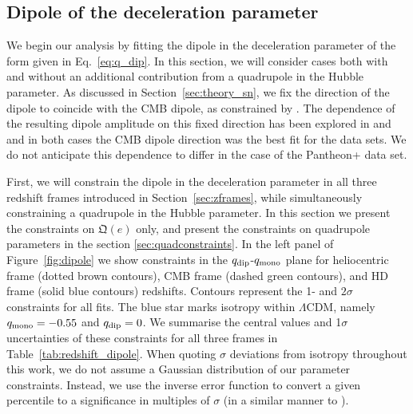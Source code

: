 \documentclass[fleqn,usenatbib]{mnras}
\newcommand{\jess}[1]{\textcolor{magenta} {\textbf{[JAC]:{#1}}}}
\begin{document}
\subsection{Dipole of the deceleration parameter}\label{sec:dipconstraints}
We begin our analysis by fitting the dipole in the deceleration parameter of the form given in Eq.~\eqref{eq:q_dip}. 
{In this section, we will consider cases} both with and without an additional contribution from a quadrupole in the Hubble parameter. 
{As discussed in Section~\ref{sec:theory_sn},} we fix the direction of the dipole to coincide with the CMB dipole, as constrained by \citet{Planck_2018_III_High_freq}.
The dependence of the {resulting dipole amplitude} on this fixed direction has been explored in  and \citet{Sarkar2019} and in both cases the CMB {dipole} direction was the best fit for the data sets. {We do not anticipate this dependence to differ in the case of the Pantheon+ data set.}

{First, we will constrain the dipole in the deceleration parameter in all three redshift frames introduced in Section~\ref{sec:zframes}, while simultaneously constraining a quadrupole in the Hubble parameter. In this section we present the constraints on $\mathfrak{Q}(e)$ only, and present the constraints on quadrupole parameters in the section \ref{sec:quadconstraints}. In the left panel of Figure~\ref{fig:dipole} we show constraints in the $q_{\rm dip}$-$q_{\rm mono}$ plane for heliocentric frame (dotted brown contours), CMB frame (dashed green contours), and HD frame (solid blue contours) redshifts. Contours represent the 1- and $2\sigma$ constraints for all fits. The blue star marks isotropy within $\Lambda$CDM, namely $q_{\rm mono} = -0.55$ and $q_{\rm dip} = 0$. 
We summarise the central values and 1$\sigma$ uncertainties of these constraints for all three frames in Table~\ref{tab:redshift_dipole}. 
When quoting $\sigma$ deviations from isotropy throughout this work, we do not assume a Gaussian distribution of our parameter constraints. {Instead, we use the inverse error function to convert a given percentile to a significance in multiples of $\sigma$ (in a similar manner to ).}} 

\end{document}
